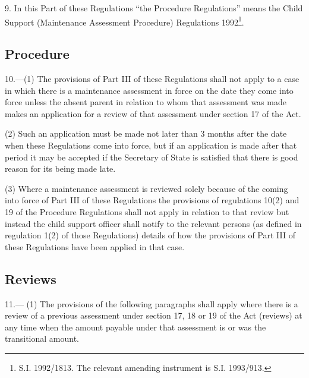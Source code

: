 \documentclass[a4paper]{article}
\begin{document}
9.  In this Part of these Regulations “the Procedure Regulations” means the Child Support (Maintenance Assessment Procedure) Regulations 1992\footnote{\frenchspacing S.I. 1992/1813. The relevant amending instrument is S.I. 1993/913.}.

\subsection[10. Procedure]{Procedure}

10.—(1) The provisions of Part III of these Regulations shall not apply to a case in which there is a maintenance assessment in force on the date they come into force unless the absent parent in relation to whom that assessment was made makes an application for a review of that assessment under section 17 of the Act.

(2) Such an application must be made not later than 3 months after the date when these Regulations come into force, but if an application is made after that period it may be accepted if the Secretary of State is satisfied that there is good reason for its being made late.

(3) Where a maintenance assessment is reviewed solely because of the coming into force of Part III of these Regulations the provisions of regulations 10(2) and 19 of the Procedure Regulations shall not apply in relation to that review but instead the child support officer shall notify to the relevant persons (as defined in regulation 1(2) of those Regulations) details of how the provisions of Part III of these Regulations have been applied in that case.


\subsection[11. Reviews]{Reviews}

11.—%
%
(1) The provisions of the following paragraphs shall apply where there is a review of a previous assessment under section 17, 18 or 19 of the Act (reviews) at any time when the amount payable under that assessment is 
or was  %
the transitional amount.
\end{document}
